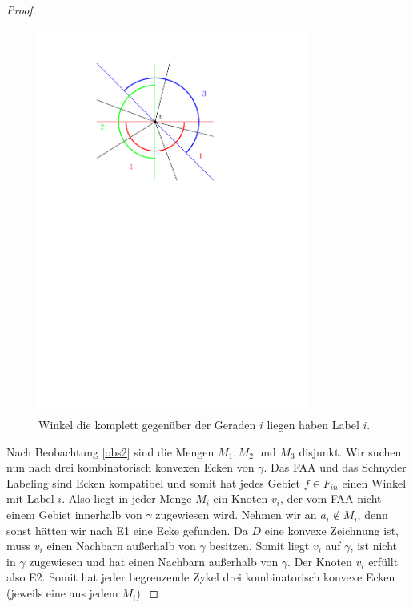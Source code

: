 \begin{proof}
\begin{figure}
\begin{minipage}{0.45\textwidth}
    \includegraphics[width=0.8\textwidth]{sweeplines2.pdf}
    \caption{Winkel die komplett gegenüber der Geraden $i$ liegen haben Label $i$.}
    \label{sweeplines2}
  \end{minipage}
\end{figure}
\captionsetup{format=plain,labelsep=endash,justification=justified,width=1\textwidth}

Nach Beobachtung \ref{obs2} sind die Mengen $M_1,M_2$ und $M_3$ disjunkt. Wir suchen nun nach drei kombinatorisch konvexen Ecken von $\gamma$. Das FAA und das Schnyder Labeling sind Ecken kompatibel und somit hat jedes Gebiet $f \in F_{in}$ einen Winkel mit Label $i$. Also liegt in jeder Menge $M_i$ ein Knoten $v_i$, der vom FAA nicht einem Gebiet innerhalb von $\gamma$ zugewiesen wird. Nehmen wir an $a_i \notin M_i$, denn sonst hätten wir nach E1 eine Ecke gefunden. Da $D$ eine konvexe Zeichnung ist, muss $v_i$ einen Nachbarn außerhalb von $\gamma$ besitzen. Somit liegt $v_i$ auf $\gamma$, ist nicht in $\gamma$ zugewiesen und hat einen Nachbarn außerhalb von $\gamma$. Der Knoten $v_i$ erfüllt also E2. Somit hat jeder begrenzende Zykel drei kombinatorisch konvexe Ecken (jeweils eine aus jedem $M_i$).
\end{proof}

